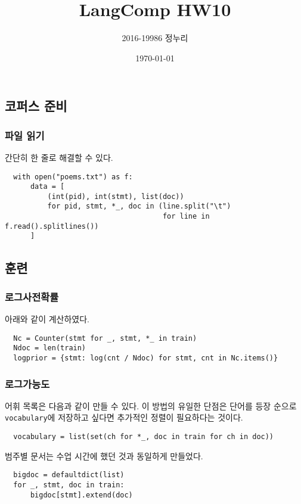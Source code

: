 \documentclass[a4paper,11pt]{scrartcl}
\title{\vspace{-0.5in}LangComp HW10}
\author{\vspace{-15pt}2016-19986 정누리}
\date{\vspace{-5pt}\today}
\begin{document}
\maketitle

\setcounter{section}{1}
\setcounter{subsection}{-1}
\subsection{코퍼스 준비}
\subsubsection{파일 읽기}
간단히 한 줄로 해결할 수 있다.
\begin{lstlisting}
  with open("poems.txt") as f:
      data = [
          (int(pid), int(stmt), list(doc))
          for pid, stmt, *_, doc in (line.split("\t")
                                     for line in f.read().splitlines())
      ]
\end{lstlisting}

\subsection{훈련}
\subsubsection{로그사전확률}
아래와 같이 계산하였다.
\begin{lstlisting}
  Nc = Counter(stmt for _, stmt, *_ in train)
  Ndoc = len(train)
  logprior = {stmt: log(cnt / Ndoc) for stmt, cnt in Nc.items()}
\end{lstlisting}

\subsubsection{로그가능도}
어휘 목록은 다음과 같이 만들 수 있다. 이 방법의 유일한 단점은 단어를 등장 순으로 \\
\lstinline{vocabulary}에 저장하고 싶다면 추가적인 정렬이 필요하다는 것이다.
\begin{lstlisting}
  vocabulary = list(set(ch for *_, doc in train for ch in doc))
\end{lstlisting}

범주별 문서는 수업 시간에 했던 것과 동일하게 만들었다.
\begin{lstlisting}
  bigdoc = defaultdict(list)
  for _, stmt, doc in train:
      bigdoc[stmt].extend(doc)
\end{lstlisting}
\end{document}
